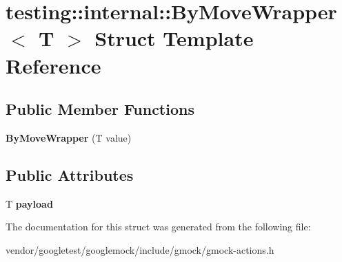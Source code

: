 \hypertarget{structtesting_1_1internal_1_1ByMoveWrapper}{}\section{testing\+:\+:internal\+:\+:By\+Move\+Wrapper$<$ T $>$ Struct Template Reference}
\label{structtesting_1_1internal_1_1ByMoveWrapper}
\subsection*{Public Member Functions}
\begin{DoxyCompactItemize}
\item 
{\bfseries By\+Move\+Wrapper} (T value)\hypertarget{structtesting_1_1internal_1_1ByMoveWrapper_a60df33395785e0bfc5f72fba32376349}{}\label{structtesting_1_1internal_1_1ByMoveWrapper_a60df33395785e0bfc5f72fba32376349}

\end{DoxyCompactItemize}
\subsection*{Public Attributes}
\begin{DoxyCompactItemize}
\item 
T {\bfseries payload}\hypertarget{structtesting_1_1internal_1_1ByMoveWrapper_ae8407b1ae99db3f00797d68b9ee9e870}{}\label{structtesting_1_1internal_1_1ByMoveWrapper_ae8407b1ae99db3f00797d68b9ee9e870}

\end{DoxyCompactItemize}


The documentation for this struct was generated from the following file\+:\begin{DoxyCompactItemize}
\item 
vendor/googletest/googlemock/include/gmock/gmock-\/actions.\+h\end{DoxyCompactItemize}
